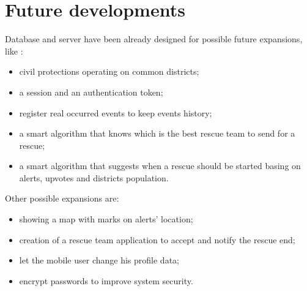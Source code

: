 \documentclass[a4paper,12pt]{report}
\begin{document}
\section{Future developments}

Database and server have been already designed for possible future expansions, like :
\begin{itemize}
\item civil protections operating on common districts;
\item a session and an authentication token;
\item register real occurred events to keep events history;
\item a smart algorithm that knows which is the best rescue team to send for a rescue;
\item a smart algorithm that suggests when a rescue should be started basing on alerts, upvotes and districts population.
\end{itemize}

Other possible expansions are:

\begin{itemize}
\item showing a map with marks on alerts' location;
\item creation of a rescue team application to accept and notify the rescue end;
\item let the mobile user change his profile data;
\item encrypt passwords to improve system security.
\end{itemize}
\end{document}
